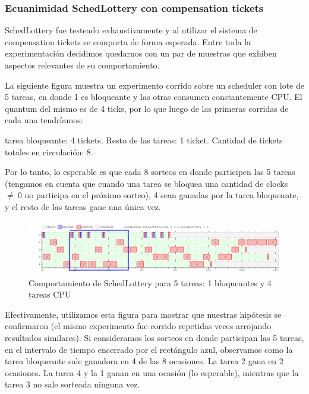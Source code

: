 \subsubsection{Ecuanimidad SchedLottery con compensation tickets}

SchedLottery fue testeado exhaustivamente y al utilizar el sistema de compensation tickets se comporta de forma esperada. Entre toda la experimentación
decidimos quedarnos con un par de muestras que exhiben aspectos relevantes de su comportamiento.

La siguiente figura muestra un experimento corrido sobre un scheduler con lote de 5 tareas, en donde 1 es bloqueante y las otras consumen constantemente CPU. 
El quantum del mismo es de 4 ticks, por lo que luego de las primeras corridas de cada una tendríamos: 

tarea bloqueante: 4 tickets. Resto de las tareas: 1 ticket. Cantidad de tickets totales en circulación: 8. 

Por lo tanto, lo esperable es que cada 8 sorteos en donde participen las 5 tareas (tengamos en cuenta que cuando una tarea se bloquea una cantidad de clocks $\neq \ 0$ no 
participa en el próximo sorteo), 4 sean ganadas por la tarea bloqueante, y el resto de las tareas gane una única vez.

\begin{figure}[!h]
	\begin{center}
		  \includegraphics[scale=0.5]{Graficos/intervalo_8.png}
		  \caption{Comportamiento de SchedLottery para 5 tareas: 1 bloqueantes y 4 tareas CPU }
		  \label{fig:contra1}
	\end{center}
\end{figure}
\FloatBarrier

Efectivamente, utilizamos esta figura para mostrar que nuestras hipótesis se confirmaron (el mismo experimento fue corrido repetidas veces arrojando resultados similares).
Si consideramos los sorteos en donde participan las 5 tareas, en el intervalo de tiempo encerrado por el rectángulo azul, observamos como la tarea bloqueante sale
ganadora en 4 de las 8 ocasiones. La tarea 2 gana en 2 ocasiones. La tarea 4 y la 1 ganan en una ocasión (lo esperable), mientras que la tarea 3 no sale sorteada ninguna vez.

